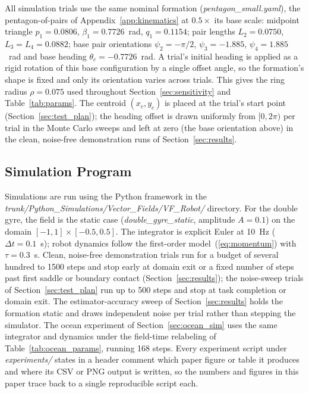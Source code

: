 \documentclass[lettersize,journal]{IEEEtran}
\begin{document}
All simulation trials use the same nominal formation
(\textit{pentagon\_small.yaml}), the pentagon-of-pairs of
Appendix~\ref{app:kinematics} at $0.5\times$ its base scale: midpoint
triangle $p_1 = 0.0806$, $\beta_1 = 0.7726$~rad, $q_1 = 0.1154$; pair
lengths $L_2 = 0.0750$, $L_3 = L_4 = 0.0882$; base pair orientations
$\psi_2 = -\pi/2$, $\psi_3 = -1.885$, $\psi_4 = 1.885$~rad and base
heading $\theta_c = -0.7726$~rad. A trial's initial heading is applied
as a rigid rotation of this base configuration by a single offset
angle, so the formation's shape is fixed and only its orientation
varies across trials. This gives the ring radius $\rho = 0.075$ used
throughout Section~\ref{sec:sensitivity} and Table~\ref{tab:params}.
The centroid $(x_c, y_c)$ is placed at the trial's start point
(Section~\ref{sec:test_plan}); the heading offset is drawn uniformly
from $[0, 2\pi)$ per trial in the Monte Carlo sweeps and left at zero
(the base orientation above) in the clean, noise-free demonstration
runs of Section~\ref{sec:results}.

\subsection{Simulation Program}

Simulations are run using the Python framework in the
\textit{trunk/Python\_Simulations/Vector\_Fields/VF\_Robot/} directory.
For the double gyre, the field is the static case
(\textit{double\_gyre\_static}, amplitude $A = 0.1$) on the domain
$[-1, 1] \times [-0.5, 0.5]$. The integrator is explicit Euler at
10~Hz ($\Delta t = 0.1$~s); robot dynamics follow the first-order
model~(\ref{eq:momentum}) with $\tau = 0.3$~s. Clean, noise-free
demonstration trials run for a budget of several hundred to 1500 steps
and stop early at domain exit or a fixed number of steps past first
saddle or boundary contact (Section~\ref{sec:results}); the noise-sweep trials of
Section~\ref{sec:test_plan} run up to 500 steps and stop at task
completion or domain exit. The estimator-accuracy sweep of
Section~\ref{sec:results} holds the formation static and draws
independent noise per trial rather than stepping the simulator. The
ocean experiment of Section~\ref{sec:ocean_sim} uses the same
integrator and dynamics under the field-time relabeling of
Table~\ref{tab:ocean_params}, running 168 steps. Every experiment
script under \textit{experiments/} states in a header comment which
paper figure or table it produces and where its CSV or PNG output is
written, so the numbers and figures in this paper trace back to a
single reproducible script each.
\end{document}
